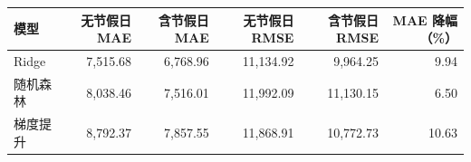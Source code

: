\begin{tabular}{lrrrrr}
\toprule
模型 & 无节假日 MAE & 含节假日 MAE & 无节假日 RMSE & 含节假日 RMSE & MAE 降幅（\%） \\
\midrule
Ridge & 7,515.68 & 6,768.96 & 11,134.92 & 9,964.25 & 9.94 \\
随机森林 & 8,038.46 & 7,516.01 & 11,992.09 & 11,130.15 & 6.50 \\
梯度提升 & 8,792.37 & 7,857.55 & 11,868.91 & 10,772.73 & 10.63 \\
\bottomrule
\end{tabular}
